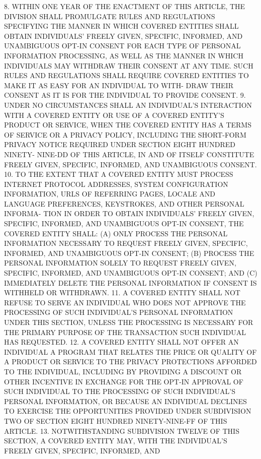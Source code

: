    8. WITHIN ONE YEAR OF THE ENACTMENT  OF  THIS  ARTICLE,  THE  DIVISION
 SHALL  PROMULGATE  RULES  AND REGULATIONS SPECIFYING THE MANNER IN WHICH
 COVERED ENTITIES  SHALL  OBTAIN  INDIVIDUALS'  FREELY  GIVEN,  SPECIFIC,
 INFORMED,  AND  UNAMBIGUOUS  OPT-IN  CONSENT  FOR  EACH TYPE OF PERSONAL
 INFORMATION  PROCESSING,  AS WELL AS THE MANNER IN WHICH INDIVIDUALS MAY
 WITHDRAW THEIR CONSENT AT ANY TIME. SUCH  RULES  AND  REGULATIONS  SHALL
 REQUIRE  COVERED  ENTITIES TO MAKE IT AS EASY FOR AN INDIVIDUAL TO WITH-
 DRAW THEIR CONSENT AS IT IS FOR THE INDIVIDUAL TO PROVIDE CONSENT.
   9. UNDER NO CIRCUMSTANCES SHALL AN  INDIVIDUAL'S  INTERACTION  WITH  A
 COVERED ENTITY OR USE OF A COVERED ENTITY'S PRODUCT OR SERVICE, WHEN THE
 COVERED ENTITY HAS A TERMS OF SERVICE OR A PRIVACY POLICY, INCLUDING THE
 SHORT-FORM  PRIVACY  NOTICE REQUIRED UNDER SECTION EIGHT HUNDRED NINETY-
 NINE-DD OF THIS ARTICLE, IN  AND  OF  ITSELF  CONSTITUTE  FREELY  GIVEN,
 SPECIFIC, INFORMED, AND UNAMBIGUOUS CONSENT.
   10. TO THE EXTENT THAT A COVERED ENTITY MUST PROCESS INTERNET PROTOCOL
 ADDRESSES,  SYSTEM  CONFIGURATION  INFORMATION, URLS OF REFERRING PAGES,
 LOCALE AND LANGUAGE PREFERENCES, KEYSTROKES, AND OTHER PERSONAL INFORMA-
 TION IN ORDER TO OBTAIN INDIVIDUALS' FREELY GIVEN,  SPECIFIC,  INFORMED,
 AND UNAMBIGUOUS OPT-IN CONSENT, THE COVERED ENTITY SHALL:
   (A)  ONLY PROCESS THE PERSONAL INFORMATION NECESSARY TO REQUEST FREELY
 GIVEN, SPECIFIC, INFORMED, AND UNAMBIGUOUS OPT-IN CONSENT;
   (B) PROCESS THE PERSONAL INFORMATION SOLELY TO REQUEST  FREELY  GIVEN,
 SPECIFIC, INFORMED, AND UNAMBIGUOUS OPT-IN CONSENT; AND
   (C) IMMEDIATELY DELETE THE PERSONAL INFORMATION IF CONSENT IS WITHHELD
 OR WITHDRAWN.
   11.  A COVERED ENTITY SHALL NOT REFUSE TO SERVE AN INDIVIDUAL WHO DOES
 NOT APPROVE THE PROCESSING OF  SUCH  INDIVIDUAL'S  PERSONAL  INFORMATION
 UNDER  THIS  SECTION, UNLESS THE PROCESSING IS NECESSARY FOR THE PRIMARY
 PURPOSE OF THE TRANSACTION SUCH INDIVIDUAL HAS REQUESTED.
   12. A COVERED ENTITY SHALL NOT OFFER  AN  INDIVIDUAL  A  PROGRAM  THAT
 RELATES  THE  PRICE  OR  QUALITY  OF A PRODUCT OR SERVICE TO THE PRIVACY
 PROTECTIONS  AFFORDED  TO  THE  INDIVIDUAL,  INCLUDING  BY  PROVIDING  A
 DISCOUNT  OR OTHER INCENTIVE IN EXCHANGE FOR THE OPT-IN APPROVAL OF SUCH
 INDIVIDUAL TO THE PROCESSING OF SUCH INDIVIDUAL'S PERSONAL  INFORMATION,
 OR BECAUSE AN INDIVIDUAL DECLINES TO EXERCISE THE OPPORTUNITIES PROVIDED
 UNDER  SUBDIVISION  TWO  OF SECTION EIGHT HUNDRED NINETY-NINE-FF OF THIS
 ARTICLE.
   13. NOTWITHSTANDING SUBDIVISION TWELVE  OF  THIS  SECTION,  A  COVERED
 ENTITY  MAY, WITH THE INDIVIDUAL'S FREELY GIVEN, SPECIFIC, INFORMED, AND
